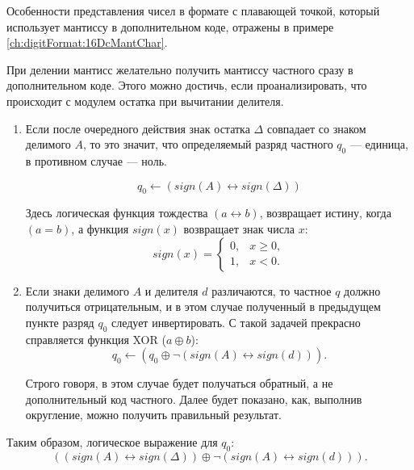 Особенности представления чисел в формате с плавающей точкой, который использует мантиссу в дополнительном коде, отражены в примере \ref{ch:digitFormat:16DcMantChar}.

При делении мантисс желательно получить мантиссу частного сразу в дополнительном коде. Этого можно достичь, если проанализировать, что происходит с модулем остатка при вычитании делителя.
\begin{enumerate}
    \item Если после очередного действия знак остатка $\Delta$ совпадает со знаком делимого $A$, то это значит, что определяемый разряд частного $q_0$ --- единица, в противном случае --- ноль. 
    
    \[q_0\gets(sign(A)\leftrightarrow sign(\Delta))\]
    
    Здесь логическая функция тождества $(a\leftrightarrow b)$, возвращает истину, когда $(a=b)$, а функция $sign(x)$ возвращает знак числа $x$:
    \[
        sign(x)=
        \begin{cases}
            0, & x \geq 0, \\
            1, & x < 0.
        \end{cases}
    \]
    
    \item Если знаки делимого $A$ и делителя $d$ различаются, то частное $q$ должно получиться отрицательным, и в этом случае полученный в предыдущем пункте разряд $q_0$ следует инвертировать. С такой задачей прекрасно справляется функция XOR ($a\oplus b$):
    \[q_0\gets (q_0\oplus \lnot(sign(A)\leftrightarrow sign(d))).\]
    
    Строго говоря, в этом случае будет получаться обратный, а не дополнительный код частного. Далее будет показано, как, выполнив округление, можно получить правильный результат.
\end{enumerate}

Таким образом, логическое выражение для $q_0$:
\[((sign(A)\leftrightarrow sign(\Delta))\oplus \lnot(sign(A)\leftrightarrow sign(d))).\]

